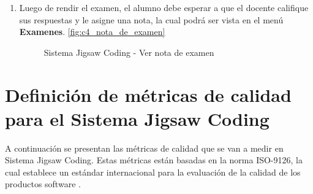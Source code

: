 \begin{enumerate}
	\item Luego de rendir el examen, el alumno debe esperar a que el docente califique sus respuestas y le asigne una nota, la cual podrá ser vista en el menú \textbf{Examenes}. \autoref{fig:c4_nota_de_examen}
	
	\begin{figure}[h]
		\centering
		\caption{Sistema Jigsaw Coding - Ver nota de examen}
		\label{fig:c4_nota_de_examen}
	\end{figure}
	
\end{enumerate}
\clearpage
\section{Definición de métricas de calidad para el Sistema Jigsaw Coding}
\label{sec:metricas_calidad}
A continuación se presentan las métricas de calidad que se van a medir en Sistema Jigsaw Coding. Estas métricas están basadas en la norma ISO-9126, la cual establece un estándar internacional para la evaluación de la calidad de los productos software \cite{iso9126-3}.

